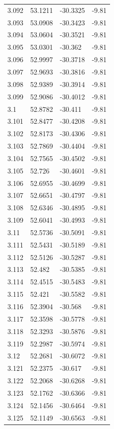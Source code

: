 \begin{tabular}{llll}
3.092 & 53.1211 & -30.3325 & -9.81 \\
3.093 & 53.0908 & -30.3423 & -9.81 \\
3.094 & 53.0604 & -30.3521 & -9.81 \\
3.095 & 53.0301 & -30.362 & -9.81 \\
3.096 & 52.9997 & -30.3718 & -9.81 \\
3.097 & 52.9693 & -30.3816 & -9.81 \\
3.098 & 52.9389 & -30.3914 & -9.81 \\
3.099 & 52.9086 & -30.4012 & -9.81 \\
3.1 & 52.8782 & -30.411 & -9.81 \\
3.101 & 52.8477 & -30.4208 & -9.81 \\
3.102 & 52.8173 & -30.4306 & -9.81 \\
3.103 & 52.7869 & -30.4404 & -9.81 \\
3.104 & 52.7565 & -30.4502 & -9.81 \\
3.105 & 52.726 & -30.4601 & -9.81 \\
3.106 & 52.6955 & -30.4699 & -9.81 \\
3.107 & 52.6651 & -30.4797 & -9.81 \\
3.108 & 52.6346 & -30.4895 & -9.81 \\
3.109 & 52.6041 & -30.4993 & -9.81 \\
3.11 & 52.5736 & -30.5091 & -9.81 \\
3.111 & 52.5431 & -30.5189 & -9.81 \\
3.112 & 52.5126 & -30.5287 & -9.81 \\
3.113 & 52.482 & -30.5385 & -9.81 \\
3.114 & 52.4515 & -30.5483 & -9.81 \\
3.115 & 52.421 & -30.5582 & -9.81 \\
3.116 & 52.3904 & -30.568 & -9.81 \\
3.117 & 52.3598 & -30.5778 & -9.81 \\
3.118 & 52.3293 & -30.5876 & -9.81 \\
3.119 & 52.2987 & -30.5974 & -9.81 \\
3.12 & 52.2681 & -30.6072 & -9.81 \\
3.121 & 52.2375 & -30.617 & -9.81 \\
3.122 & 52.2068 & -30.6268 & -9.81 \\
3.123 & 52.1762 & -30.6366 & -9.81 \\
3.124 & 52.1456 & -30.6464 & -9.81 \\
3.125 & 52.1149 & -30.6563 & -9.81 \\

\end{tabular}
